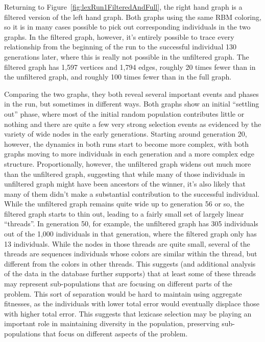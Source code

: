 \documentclass{sig-alternate}
\begin{document}
Returning to Figure~\ref{fig:lexRun1FilteredAndFull}, the right hand graph is
a filtered version of the left hand graph. Both graphs using the same RBM
coloring, so it is in many cases possible to pick out corresponding individuals
in the two graphs. In the filtered graph, however, it's entirely possible to
trace every relationship from the beginning of the run to the successful
individual 130 generations later, where this is really not possible in the
unfiltered graph. The filtered graph has 1,597 vertices and 1,794 edges, roughly
20 times fewer than in the unfiltered graph, and roughly 100 times fewer than
in the full graph.

Comparing the two graphs, they both reveal several important events and phases 
in the run, but sometimes in different ways. Both graphs show an initial 
``settling out'' phase, where most of the initial random population contributes
little or nothing and there are quite a few very strong selection events as
evidenced by the variety of wide nodes in the early generations. Starting
around generation 20, however, the dynamics in both runs start to become more
complex, with both graphs moving to more individuals in each generation and a
more complex edge structure. Proportionally, however, the unfiltered graph
widens out much more than the unfiltered graph, suggesting that while many of
those individuals in unfiltered graph might have been ancestors of the winner,
it's also likely that many of them didn't make a substantial contribution to
the successful individual. While the unfiltered graph remains quite wide up to
generation 56 or so, the filtered graph starts to thin out, leading to a fairly
small set of largely linear ``threads''. In generation 50, for example, the 
unfiltered graph has 305 individuals out of the 1,000 individuals in that 
generation, where the filtered graph only has 13 individuals. While the nodes in
those threads are quite small, several of the threads are sequences individuals
whose colors are similar within the thread, but different from the colors in
other threads. This suggests (and additional analysis of the data in the
database further supports) that at least some of these threads may represent
sub-populations that are focusing on different parts of the problem. This sort
of separation would be hard to maintain using aggregate fitnesses, as the
individuals with lower total error would eventually displace those with higher 
total error. This suggests that lexicase selection may be playing an important
role in maintaining diversity in the population, preserving sub-populations that
focus on different aspects of the problem.
\end{document}
